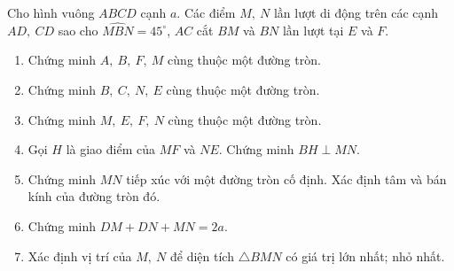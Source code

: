 \begin{bt}%
	Cho hình vuông $ABCD$ cạnh $a$. Các điểm $M,\ N$ lần lượt di động trên các cạnh $AD,\ CD$ sao cho $\widehat{MBN}=45^\circ$, $AC$ cắt $BM$ và $BN$ lần lượt tại $E$ và $F$.
	\begin{enumerate}
		\item Chứng minh $A,\ B,\ F,\ M$ cùng thuộc một đường tròn.
		\item Chứng minh $B,\ C,\ N,\ E$ cùng thuộc một đường tròn.
		\item Chứng minh $M,\ E,\ F,\ N$ cùng thuộc một đường tròn.
		\item Gọi $H$ là giao điểm của $MF$ và $NE$. Chứng minh $BH\perp MN$.
		\item Chứng minh $MN$ tiếp xúc với một đường tròn cố định. Xác định tâm và bán kính của đường tròn đó. 
		\item Chứng minh $DM+DN+MN=2a$.
		\item Xác định vị trí của $M,\ N$ để diện tích $\triangle BMN$ có giá trị lớn nhất; nhỏ nhất.
	\end{enumerate}
\end{bt}
